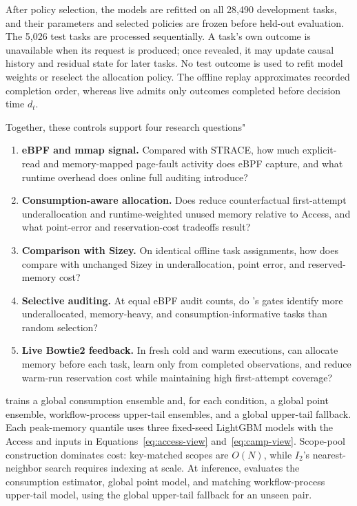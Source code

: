 After policy selection, the models are refitted on all 28,490 development
tasks, and their parameters and selected policies are frozen before held-out
evaluation. The 5,026 test tasks are processed sequentially. A task's own
outcome is unavailable when its request is produced; once revealed, it may
update causal history and residual state for later tasks. No test outcome is
used to refit model weights or reselect the allocation policy. The offline
replay approximates recorded completion order, whereas live \toolname{} admits
only outcomes completed before decision time $d_t$.

Together, these controls support four research questions" %

\begin{enumerate}[leftmargin=*,label=\textbf{RQ\arabic*:},itemsep=1pt,topsep=2pt]
\item \textbf{eBPF and mmap signal.} Compared with STRACE, how much
explicit-read and memory-mapped page-fault activity does eBPF capture, and
what runtime overhead does online full auditing introduce?
\item \textbf{Consumption-aware allocation.} Does \toolname reduce
counterfactual first-attempt underallocation and runtime-weighted unused
memory relative to Access, and what point-error and reservation-cost
tradeoffs result?
\item \textbf{Comparison with Sizey.} On identical offline task assignments,
how does \toolname compare with unchanged Sizey in underallocation, point error,
and reserved-memory cost?
\item \textbf{Selective auditing.} At equal eBPF audit counts, do \toolname{}'s
gates identify more underallocated, memory-heavy, and
consumption-informative tasks than random selection?
\item \textbf{Live Bowtie2 feedback.} In fresh cold and warm executions, can
\toolname{} allocate memory before each task, learn only from completed
observations, and reduce warm-run reservation cost while maintaining high
first-attempt coverage?
\end{enumerate}

\toolname{} trains a global consumption ensemble and, for each condition, a
global point ensemble, workflow-process upper-tail ensembles, and a global
upper-tail fallback. Each peak-memory quantile uses three fixed-seed LightGBM
models with the Access and \toolname{} inputs in
Equations~\ref{eq:access-view} and~\ref{eq:camp-view}. Scope-pool construction
dominates
cost: key-matched
scopes are $O(N)$, while $I_2$'s nearest-neighbor search requires indexing at
scale. At inference, \toolname{} evaluates the consumption estimator, global
point model, and matching workflow-process upper-tail model, using the global
upper-tail fallback for an unseen pair.

